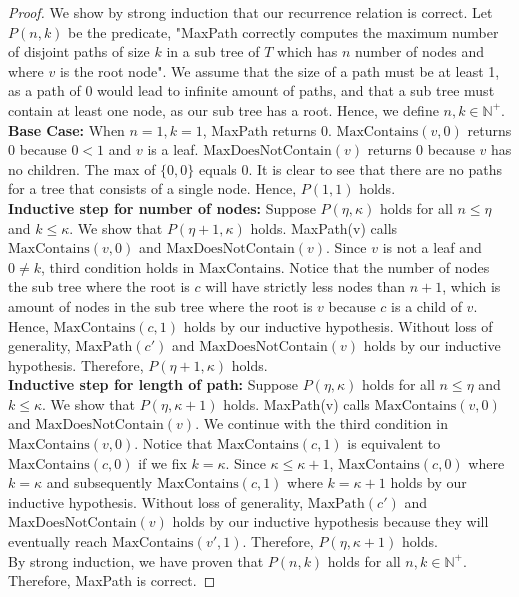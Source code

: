 \documentclass[11pt]{scrartcl}
\newcommand{\maxp}{\text{MaxPath}}
\newcommand{\ctn}{\text{MaxContains}}
\newcommand{\dctn}{\text{MaxDoesNotContain}}
\begin{document}
\begin{proof}
	We show by strong induction that our recurrence relation is correct. Let $P(n,k)$ be the predicate,
	"MaxPath correctly computes the maximum number of disjoint paths of size $k$ in a sub tree
	of $T$ which has $n$ number of nodes and where $v$ is the root node".
	We assume that the size of a path must be at least 1, as a path of 0 would lead to infinite amount of
	paths, and that a sub tree must contain at least one node, as our sub tree has a root.
	Hence, we define $n,k \in \mathbb{N}^+$. \\
	\textbf{Base Case:} When $n = 1, k = 1$, MaxPath returns 0. $\ctn(v,0)$ returns 0 because
	$0 < 1$ and $v$ is a leaf. $\dctn(v)$ returns 0 because $v$ has no children. The max of $\{0,0\}$
	equals $0$. It is clear to see that there are no paths for a tree that consists of a single node.
	Hence, $P(1,1)$ holds.\\
	\textbf{Inductive step for number of nodes:} Suppose $P(\eta,\kappa)$ holds for all $n \leq \eta$ and $k \leq \kappa$.
	We show that $P(\eta + 1,\kappa)$ holds. MaxPath(v) calls $\ctn(v,0)$ and $\dctn(v)$. Since $v$
	is not a leaf and $0 \neq k$, third condition holds in $\ctn$.
	Notice that the number of nodes the sub tree where the root is $c$ will have strictly less nodes than $n + 1$,
	which is amount of nodes in the sub tree where the root is $v$ because $c$ is a child of $v$.
	Hence, $\ctn(c, 1)$ holds by our inductive hypothesis.
	Without loss of generality, $\maxp(c')$ and $\dctn(v)$ holds by our inductive hypothesis.
	Therefore, $P(\eta + 1,\kappa)$ holds.\\
	\textbf{Inductive step for length of path:} Suppose $P(\eta,\kappa)$ holds for all $n \leq \eta$ and
	$k \leq \kappa$. We show that $P(\eta,\kappa + 1)$ holds. MaxPath(v) calls $\ctn(v,0)$ and $\dctn(v)$.
	We continue with the third condition in $\ctn(v,0)$.
	Notice that $\ctn(c, 1)$ is equivalent to $\ctn(c,0)$ if we fix $k = \kappa$.
	Since $\kappa \leq \kappa + 1$, $\ctn(c,0)$ where $k = \kappa$ and subsequently
	$\ctn(c, 1)$ where $k = \kappa + 1$ holds by our inductive hypothesis.
	Without loss of generality, $\maxp(c')$ and $\dctn(v)$ holds by our inductive hypothesis
	because they will eventually reach $\ctn(v', 1)$. Therefore, $P(\eta,\kappa+ 1)$ holds.\\
	By strong induction, we have proven that $P(n,k)$ holds for all $n,k \in \mathbb{N}^+$.
	Therefore, MaxPath is correct.
\end{proof}
\pagebreak 
\end{document}

